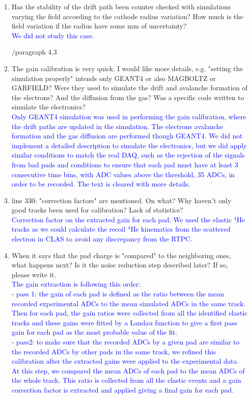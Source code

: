 \documentclass[a4paper,11pt,twoside]{article}
\begin{document}
\begin{enumerate}
\item Has the stability of the drift path been counter checked with simulations 
   varying the field according to the cathode radius variation? How much is the 
   field variation if the radius have some mm of uncertainty?\\
\textcolor{blue}{We did not study this case. } 

        /paragraph 4.3
\item The gain calibration is very quick. I would like more details, e.g. 
   "setting the simulation properly" intends only GEANT4 or also MAGBOLTZ or 
   GARFIELD? Were they used to simulate the drift and avalanche formation of 
   the electrons? And the diffusion from the gas? Was a specific code written 
   to simulate the electronics?\\
\textcolor{blue}{Only GEANT4 simulation was used in performing the gain 
   calibration, where the drift paths are updated in the simulation. The 
   electrons avalanche formation and the gas diffusion are performed though 
GEANT4. We did not implement a detailed description to simulate the 
electronics, but we did apply similar conditions to match the real DAQ, such as 
the rejection of the signals from bad pads and conditions to ensure that each 
pad must have at least 3 consecutive time bins, with ADC values above the 
threshold, 35 ADCs, in order to be recorded. The text is cleared with more 
details. } 

\item line 330: "correction factors" are mentioned. On what? Why haven't only 
   good tracks been used for calibration? Lack of statistics?\\
\textcolor{blue}{Correction factor on the extracted gain for each pad. We used 
the elastic $^4$He tracks as we could calculate the recoil $^4$He kinematics 
from the scattered electron in CLAS to avoid any discrepancy from the RTPC.} 

\item When it says that the pad charge is "compared" to the neighboring ones, 
   what happens next? Is it the noise reduction step described later? If so, 
   please write it. \\
\textcolor{blue}{The gain extraction is following this order: \\
- pass 1: the gain of each pad is defined as the ratio between the mean 
recorded experimental ADCs to the mean simulated ADCs in the same track. Then 
for each pad, the gain ratios were collected from all the identified elastic 
tracks and these gains were fitted by a Landau function to give a
  first pass gain for each pad as the most probable value of the fit.\\
 - pass2: to make sure that the recorded ADCs by a given pad are similar to the 
 recorded ADCs by other pads in the same track, we refined this calibration 
 after the extracted gains were applied to the experimental data. At this step, 
 we compared the mean ADCs of each pad to the mean ADCs of the whole track. 
 This ratio is collected from all the elastic events and a gain correction 
 factor is extracted and applied giving a final gain for each pad.
  } 


\end{enumerate}
\end{document}
